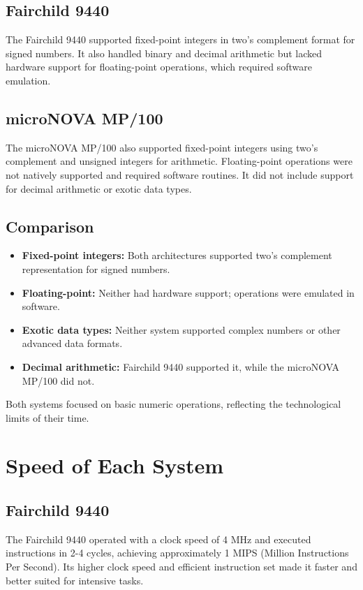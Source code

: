 \documentclass[a4paper,12pt]{article}
\begin{document}
\subsection{Fairchild 9440}

The Fairchild 9440 supported fixed-point integers in two's complement format for signed numbers. It also handled binary and decimal arithmetic but lacked hardware support for floating-point operations, which required software emulation.

\subsection{microNOVA MP/100}

The microNOVA MP/100 also supported fixed-point integers using two's complement and unsigned integers for arithmetic. Floating-point operations were not natively supported and required software routines. It did not include support for decimal arithmetic or exotic data types.

\subsection{Comparison}

\begin{itemize}
    \item \textbf{Fixed-point integers:} Both architectures supported two's complement representation for signed numbers.
    \item \textbf{Floating-point:} Neither had hardware support; operations were emulated in software.
    \item \textbf{Exotic data types:} Neither system supported complex numbers or other advanced data formats.
    \item \textbf{Decimal arithmetic:} Fairchild 9440 supported it, while the microNOVA MP/100 did not.
\end{itemize}

Both systems focused on basic numeric operations, reflecting the technological limits of their time.
\section{Speed of Each System}

\subsection{Fairchild 9440}

The Fairchild 9440 operated with a clock speed of 4 MHz and executed instructions in 2-4 cycles, achieving approximately 1 MIPS (Million Instructions Per Second). Its higher clock speed and efficient instruction set made it faster and better suited for intensive tasks.
\end{document}
